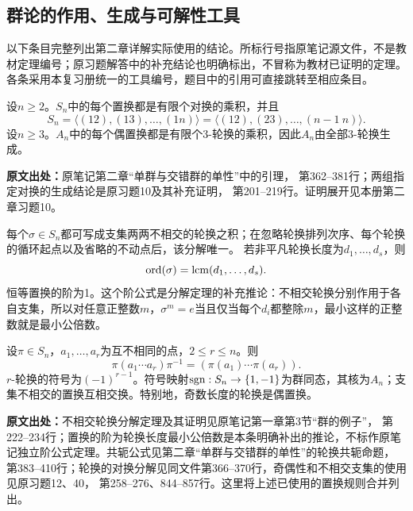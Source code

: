 \subsection{群论的作用、生成与可解性工具}
以下条目完整列出第二章详解实际使用的结论。所标行号指原笔记源文件，不是教材定理编号；原习题解答中的补充结论也明确标出，不冒称为教材已证明的定理。各条采用本复习册统一的工具编号，题目中的引用可直接跳转至相应条目。

\begin{reviewtheorem}\label{tool:a-permutation-generation}
设$n\ge2$。$S_n$中的每个置换都是有限个对换的乘积，并且
\[
S_n=\langle(12),(13),\ldots,(1n)\rangle
=\langle(12),(23),\ldots,(n-1\ n)\rangle.
\]
设$n\ge3$。$A_n$中的每个偶置换都是有限个3-轮换的乘积，因此$A_n$由全部3-轮换生成。

\textbf{原文出处：}原笔记第二章“单群与交错群的单性”中的引理， 第362--381行；两组指定对换的生成结论是原习题10及其补充证明， 第201--219行。证明展开见本册第二章习题10。
\end{reviewtheorem}

\begin{reviewprop}\label{tool:a-cycle-conjugation}
每个$\sigma\in S_n$都可写成支集两两不相交的轮换之积；在忽略轮换排列次序、每个轮换的循环起点以及省略的不动点后，该分解唯一。
若非平凡轮换长度为$d_1,\ldots,d_s$，则
\[
\operatorname{ord}(\sigma)=\operatorname{lcm}(d_1,\ldots,d_s).
\]
恒等置换的阶为1。这个阶公式是分解定理的补充推论：不相交轮换分别作用于各自支集，所以对任意正整数$m$，$\sigma^m=e$当且仅当每个$d_i$都整除$m$，最小这样的正整数就是最小公倍数。

设$\pi\in S_n$，$a_1,\ldots,a_r$为互不相同的点，$2\le r\le n$。则
\[
\pi(a_1\cdots a_r)\pi^{-1}
=(\pi(a_1)\cdots\pi(a_r)).
\]
$r$-轮换的符号为$(-1)^{r-1}$。符号映射$\operatorname{sgn}:S_n\to\{1,-1\}$为群同态，其核为$A_n$；支集不相交的置换互相交换。特别地，奇数长度的轮换是偶置换。

\textbf{原文出处：}不相交轮换分解定理及其证明见原笔记第一章第3节“群的例子”， 第222--234行；置换的阶为轮换长度最小公倍数是本条明确补出的推论，不标作原笔记独立阶公式定理。共轭公式见第二章“单群与交错群的单性”的轮换共轭命题， 第383--410行；轮换的对换分解见同文件第366--370行，奇偶性和不相交支集的使用见原习题12、40， 第258--276、844--857行。这里将上述已使用的置换规则合并列出。
\end{reviewprop}

